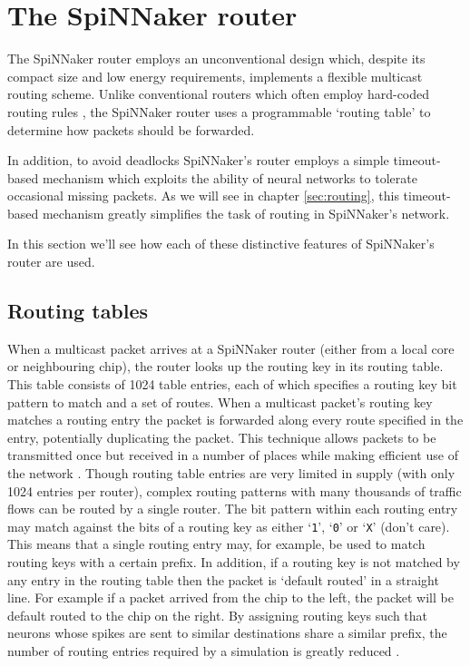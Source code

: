 	\section{The SpiNNaker router}
		
		The SpiNNaker router employs an unconventional design which, despite its
		compact size and low energy requirements, implements a flexible multicast
		routing scheme. Unlike conventional routers which often employ hard-coded
		routing rules \cite{dally04}, the SpiNNaker router uses a programmable
		`routing table' to determine how packets should be forwarded.
		
		In addition, to avoid deadlocks SpiNNaker's router employs a simple
		timeout-based mechanism which exploits the ability of neural networks to
		tolerate occasional missing packets. As we will see in chapter
		\ref{sec:routing}, this timeout-based mechanism greatly simplifies the task
		of routing in SpiNNaker's network.
		
		In this section we'll see how each of these distinctive features of
		SpiNNaker's router are used.
		
		\subsection{Routing tables}
		
			When a multicast packet arrives at a SpiNNaker router (either from a
			local core or neighbouring chip), the router looks up the routing key in
			its routing table. This table consists of \num{1024} table entries, each
			of which specifies a routing key bit pattern to match and a set of
			routes.  When a multicast packet's routing key matches a routing entry
			the packet is forwarded along every route specified in the entry,
			potentially duplicating the packet. This technique allows packets to be
			transmitted once but received in a number of places while making
			efficient use of the network \cite{navaridas12}.  Though routing table
			entries are very limited in supply (with only \num{1024} entries per
			router), complex routing patterns with many thousands of traffic flows
			can be routed by a single router. The bit pattern within each routing
			entry may match against the bits of a routing key as either `\texttt{1}',
			`\texttt{0}' or `\texttt{X}' (don't care). This means that a single
			routing entry may, for example, be used to match routing keys with a
			certain prefix. In addition, if a routing key is not matched by any entry
			in the routing table then the packet is `default routed' in a straight
			line. For example if a packet arrived from the chip to the left, the
			packet will be default routed to the chip on the right. By assigning
			routing keys such that neurons whose spikes are sent to similar
			destinations share a similar prefix, the number of routing entries
			required by a simulation is greatly reduced \cite{davies12}.
			
